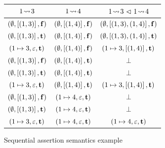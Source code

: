 \documentclass[11pt]{report}         %
\begin{document}

\begin{figure}[ht]
    \centering
    \begin{tabular}{c|c|c}
        $1 \fwriteu 3$ &  $1 \fwriteu 4$ & $1 \fwriteu 3 \fseq 1 \fwriteu 4$\\ \hline
        $(\nil,\llit{(1,3)},\bvf)$ & $(\nil,\llit{(1,4)},\bvf)$ & $(\nil,\llit{(1,3),(1,4)},\bvf)$\\ 
        $(\nil,\llit{(1,3)},\bvt)$ & $(\nil,\llit{(1,4)},\bvf)$ & $(\nil,\llit{(1,3),(1,4)},\bvt)$\\ 
        $(1 \mapsto 3,\lnil,\bvt)$ & $(\nil,\llit{(1,4)},\bvf)$ & $(1 \mapsto 3,\llit{(1,4)},\bvt)$\\ 
        $(\nil,\llit{(1,3)},\bvf)$ & $(\nil,\llit{(1,4)},\bvt)$ & $\bot$\\ 
        $(\nil,\llit{(1,3)},\bvt)$ & $(\nil,\llit{(1,4)},\bvt)$ & $\bot$\\ 
        $(1 \mapsto 3,\lnil,\bvt)$ & $(\nil,\llit{(1,4)},\bvt)$ & $(1 \mapsto 3,\llit{(1,4)},\bvt)$\\ 
        $(\nil,\llit{(1,3)},\bvf)$ & $(1 \mapsto 4,\lnil,\bvt)$ & $\bot$ \\
        $(\nil,\llit{(1,3)},\bvt)$ & $(1 \mapsto 4,\lnil,\bvt)$ & $\bot$ \\
        $(1 \mapsto 3,\lnil,\bvt)$ & $(1 \mapsto 4,\lnil,\bvt)$ & $(1 \mapsto 4,\lnil,\bvt)$\\ 
    \end{tabular}
    \caption{\label{fig:leads-to-seq-example}Sequential assertion semantics example}
\end{figure}
\end{document}
